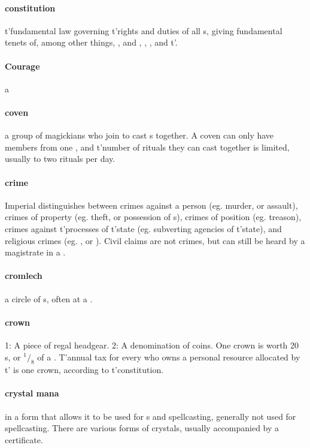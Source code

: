 \paragraph{constitution} t'\allowbreak fundamental law governing t'\allowbreak rights and duties of all s, giving fundamental tenets of, among other things, ,  and , , ,  and t'\allowbreak {}.
\paragraph{Courage} a 
\paragraph{coven} a group of magickians who join to cast s together. A coven can only have members from one , and t'\allowbreak number of rituals they can cast together is limited, usually to two rituals per day.
\paragraph{crime} Imperial  distinguishes between crimes against a person (eg. murder, or assault), crimes of property (eg. theft, or possession of s), crimes of position (eg. treason), crimes against t'\allowbreak processes of t'\allowbreak state (eg. subverting agencies of t'\allowbreak state), and religious crimes (eg. , or ). Civil claims are not crimes, but can still be heard by a magistrate in a . 
\paragraph{cromlech}  a circle of s, often at a .
\paragraph{crown} 1: A piece of regal headgear. 2: A denomination of coins. One crown is worth 20 s, or $^1/_8$ of a . T'annual tax for every  who owns a personal resource allocated by t'\allowbreak {} is one crown, according to t'\allowbreak constitution.
\paragraph{crystal mana}  in a form that allows it to be used for s and spellcasting, generally not used for spellcasting. There are various forms of crystals, usually accompanied by a certificate.

